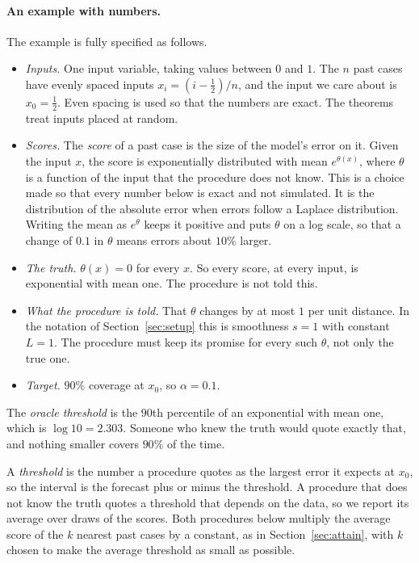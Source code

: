 \documentclass[11pt]{article}
\theoremstyle{definition}
\theoremstyle{remark}
\begin{document}
\paragraph{An example with numbers.}
The example is fully specified as follows.
\begin{itemize}
\item \emph{Inputs.} One input variable, taking values between $0$ and $1$. The $n$ past
  cases have evenly spaced inputs $x_i=(i-\tfrac12)/n$, and the input we care about is
  $x_0=\tfrac12$. Even spacing is used so that the numbers are exact. The theorems treat
  inputs placed at random.
\item \emph{Scores.} The \emph{score} of a past case is the size of the model's error on
  it. Given the input $x$, the score is exponentially distributed with mean $e^{\theta(x)}$,
  where $\theta$ is a function of the input that the procedure does not know. This is a choice made so that every number below is exact and not
  simulated. It is the distribution of the absolute error when errors follow a Laplace
  distribution. Writing the mean as $e^{\theta}$ keeps it positive and puts $\theta$ on a
  log scale, so that a change of $0.1$ in $\theta$ means errors about $10\%$ larger.
\item \emph{The truth.} $\theta(x)=0$ for every $x$. So every score, at every input, is
  exponential with mean one. The procedure is not told this.
\item \emph{What the procedure is told.} That $\theta$ changes by at most $1$ per unit
  distance. In the notation of Section~\ref{sec:setup} this is smoothness $s=1$ with
  constant $L=1$. The procedure must keep its promise for every such $\theta$, not only the
  true one.
\item \emph{Target.} $90\%$ coverage at $x_0$, so $\alpha=0.1$.
\end{itemize}
The \emph{oracle threshold} is the $90$th percentile of an exponential with mean one, which
is $\log 10=2.303$. Someone who knew the truth would quote exactly that, and nothing smaller
covers $90\%$ of the time.

A \emph{threshold} is the number a procedure quotes as the largest error it expects at
$x_0$, so the interval is the forecast plus or minus the threshold. A procedure that does
not know the truth quotes a threshold that depends on the data, so we report its average
over draws of the scores. Both procedures below multiply the average
score of the $k$ nearest past cases by a constant, as in Section~\ref{sec:attain}, with $k$
chosen to make the average threshold as small as possible.
\end{document}
